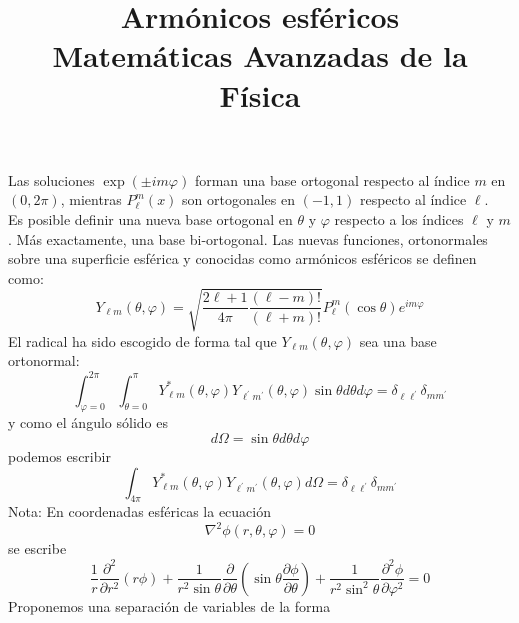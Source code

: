 
\usepackage{mathrsfs}
\usepackage{standalone}
\usepackage{tikz}
\usetikzlibrary{shapes}
\usepackage{bigints}
\newtheorem{problema}{{\it Problema}}
\title{Armónicos esféricos \\ {\large Matemáticas Avanzadas de la Física}}
\date{ }

\renewcommand\labelenumii{\theenumi.{\arabic{enumii}}}
\maketitle
\fontsize{14}{14}\selectfont
Las soluciones $\exp(\pm i m \varphi)$ forman una base ortogonal respecto al índice $m$ en $(0, 2\pi)$, mientras $P_{\ell}^{m} (x)$ son ortogonales en $(-1, 1)$ respecto al índice $\ell$.
\\
Es posible definir una nueva base ortogonal en $\theta$ y $\varphi$ respecto a los índices $\ell$ y $m$. Más exactamente, una base bi-ortogonal. Las nuevas funciones, ortonormales sobre una superficie esférica y conocidas como armónicos esféricos se definen como:
\begin{equation}
Y_{\ell m} (\theta, \varphi) = \sqrt{\dfrac{2 \ell + 1}{4 \pi} \dfrac{(\ell - m)!}{(\ell + m) !}} P_{\ell}^{m} (\cos \theta) e^{i m \varphi}
\label{eq:ecuacion_8_36}
\end{equation}
El radical ha sido escogido de forma tal que ${ Y_{\ell m} (\theta, \varphi)}$ sea una base ortonormal:
\[ \int_{\varphi = 0}^{2 \pi} \int_{\theta=0}^{\pi} Y^{*}_{\ell m} (\theta, \varphi) Y_{\ell^{\prime} m^{\prime}} (\theta, \varphi) \sin \theta d \theta d\varphi = \delta_{\ell \ell^{\prime}} \delta_{m m^{\prime}}  \]
y como el ángulo sólido es
\[ d \Omega =  \sin \theta d \theta d \varphi \]
podemos escribir
\begin{equation}
\int_{4 \pi} Y^{*}_{\ell m} (\theta, \varphi) Y_{\ell^{\prime} m^{\prime}} (\theta, \varphi) d \Omega =  \delta_{\ell \ell^{\prime}} \delta_{m m^{\prime}}
\label{eq:ecuacion_8_37}
\end{equation}
Nota: En coordenadas esféricas la ecuación
\[ \nabla^{2} \phi(r, \theta, \varphi) = 0 \]
se escribe
\[ \dfrac{1}{r} \dfrac{\partial^{2}}{\partial r^{2}} (r \phi)  + \dfrac{1}{r^{2} \sin \theta} \dfrac{\partial}{\partial \theta} \left( \sin \theta \dfrac{\partial \phi}{\partial \theta} \right) + \dfrac{1}{r^{2} \sin^{2} \theta} \dfrac{\partial^{2} \phi}{\partial \varphi^{2}}  = 0 \]
Proponemos una separación de variables de la forma
